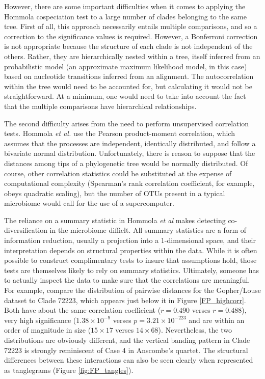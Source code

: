 

However, there are some important difficulties when it comes to applying the Hommola cospeciation test to a large number of clades belonging to the same tree. First of all, this approach necessarily entails multiple comparisons, and so a correction to the significance values is required. However, a Bonferroni correction is not appropriate because the structure of each clade is not independent of the others. Rather, they are hierarchically nested within a tree, itself inferred from an probabilistic model (an approximate maximum likelihood model, in this case) based on nucleotide transitions inferred from an alignment. The autocorrelation within the tree would need to be accounted for, but calculating it would not be straightforward. At a minimum, one would need to take into account the fact that the multiple comparisons have hierarchical relationships.

The second difficulty arises from the need to perform unsupervised correlation tests. Hommola {\em et al.} use the Pearson product-moment correlation, which assumes that the processes are independent, identically distributed, and follow a bivariate normal distribution. Unfortunately, there is reason to suppose that the distances among tips of a phylogenetic tree would be normally distributed. Of course, other correlation statistics could be substituted at the expense of computational complexity (Spearman's rank correlation coefficient, for example, obeys quadratic scaling), but the number of OTUs present in a typical microbiome would call for the use of a supercomputer.



The reliance on a summary statistic in Hommola {\em et al} makes detecting co-diversification in the microbiome difficlt. All summary statistics are a form of information reduction, usually a projection into a 1-dimensional space, and their interpretation depends on structural properties within the data. While it is often possible to construct complimentary tests to insure that assumptions hold, those tests are themselves likely to rely on summary statistics. Ultimately, someone has to actually inspect the data to make sure that the correlations are meaningful. \cite{anscombe1973graphs} For example, compare the distribution of pairwise distances for the Gopher/Louse dataset \cite{hafner1994disparate} to Clade 72223, which appears just below it in Figure \ref{FP_highcorr}. Both have about the same correlation coefficient ($r=0.490$ verses $r=0.488$), very high significance ($1.38\times 10^{-9}$ verses $p=3.21\times 10^{-223}$ and are within an order of magnitude in size ($15 \times 17$ verses $14 \times 68$). Nevertheless, the two distributions are obviously different, and the vertical banding pattern in Clade 72223 is strongly reminiscent of Case 4 in Anscombe's quartet. The structural differences between these interactions can also be seen clearly when represented as tanglegrams (Figure \ref{fig:FP_tangles}).

